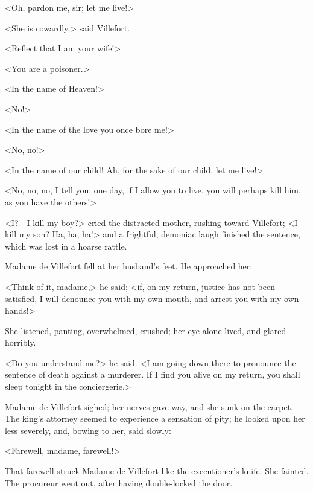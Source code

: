 <Oh, pardon me, sir; let me live!> 

 <She is cowardly,> said Villefort. 

 <Reflect that I am your wife!> 

 <You are a poisoner.> 

 <In the name of Heaven!> 

 <No!> 

 <In the name of the love you once bore me!> 

 <No, no!> 

 <In the name of our child! Ah, for the sake of our child, let me live!>

<No, no, no, I tell you; one day, if I allow you to live, you will perhaps kill him, as you have the others!> 

 <I?—I kill my boy?> cried the distracted mother, rushing toward Villefort; <I kill my son? Ha, ha, ha!> and a frightful, demoniac laugh finished the sentence, which was lost in a hoarse rattle. 

 Madame de Villefort fell at her husband's feet. He approached her. 

 <Think of it, madame,> he said; <if, on my return, justice has not been satisfied, I will denounce you with my own mouth, and arrest you with my own hands!> 

 She listened, panting, overwhelmed, crushed; her eye alone lived, and glared horribly. 

 <Do you understand me?> he said. <I am going down there to pronounce the sentence of death against a murderer. If I find you alive on my return, you shall sleep tonight in the conciergerie.> 

 Madame de Villefort sighed; her nerves gave way, and she sunk on the carpet. The king's attorney seemed to experience a sensation of pity; he looked upon her less severely, and, bowing to her, said slowly: 

 <Farewell, madame, farewell!> 

 That farewell struck Madame de Villefort like the executioner's knife. She fainted. The procureur went out, after having double-locked the door. 
